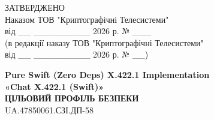 \documentclass[10pt]{article}
\begin{document}
\begin{flushright}
ЗАТВЕРДЖЕНО\\
Наказом ТОВ "Криптографічні Телесистеми"\\
від \_\_ \_\_\_\_\_\_\_\_\_ 2026 р. № \_\_\_\\
(в редакції наказу ТОВ "Криптографічні Телесистеми"\\
від \_\_ \_\_\_\_\_\_\_\_\_ 2026 р. № \_\_)
\end{flushright}

\vspace{2cm}

\begin{center}
\textbf{\Large Pure Swift (Zero Deps) X.422.1 Implementation}\\
\textbf{\Large «Chat X.422.1 (Swift)»}\\
\vspace{1cm}
\textbf{\Large ЦІЛЬОВИЙ ПРОФІЛЬ БЕЗПЕКИ}\\
\vspace{0.5cm}
\large UA.47850061.СЗІ.ДП-58
\end{center}

\newpage
\end{document}
